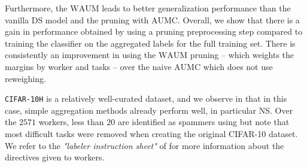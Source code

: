 Furthermore, the $\mathrm{WAUM}$ leads to better generalization performance than the vanilla DS model and the pruning with $\mathrm{AUMC}$.
Overall, we show that there is a gain in performance obtained by using a pruning preprocessing step compared to training the classifier on the aggregated labels for the full training set.
There is consistently an improvement in using the $\mathrm{WAUM}$ pruning -- which weights the margins by worker and tasks -- over the naive $\mathrm{AUMC}$ which does not use reweighing.


\texttt{CIFAR-10H} is a relatively well-curated dataset, and we observe in  that in this case, simple aggregation methods already perform well, in particular NS.
Over the $2571$ workers, less than $20$ are identified as spammers using \citet{raykar_ranking_2011} but note that most difficult tasks were removed when creating the original CIFAR-10 dataset.
We refer to the \emph{"labeler instruction sheet"} of \citet[Appendix C]{krizhevsky2009learning} for more information about the directives given to workers.

